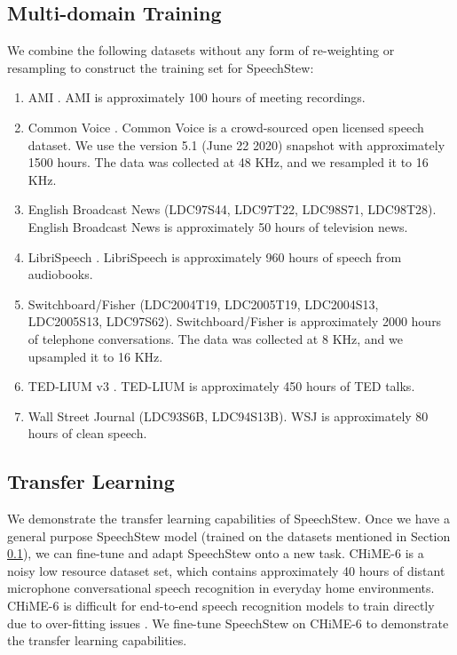 \documentclass[a4paper]{article}
\begin{document}
\subsection{Multi-domain Training}
\label{sec:mdtraining}
We combine the following datasets without any form of re-weighting or resampling to construct the training set for SpeechStew:
\begin{enumerate}[noitemsep]
    \item AMI \cite{carletta-mlmi-2005}. AMI is approximately 100 hours of meeting recordings.
    \item Common Voice \cite{lrec-2020}. Common Voice is a crowd-sourced open licensed speech dataset. We use the version 5.1 (June 22 2020) snapshot with approximately 1500 hours. The data was collected at 48 KHz, and we resampled it to 16 KHz.
    \item English Broadcast News (LDC97S44, LDC97T22, LDC98S71, LDC98T28). English Broadcast News is approximately 50 hours of television news.
    \item LibriSpeech \cite{panayotov-icassp-2015}. LibriSpeech is approximately 960 hours of speech from audiobooks.
    \item Switchboard/Fisher (LDC2004T19, LDC2005T19, LDC2004S13, LDC2005S13, LDC97S62). Switchboard/Fisher is approximately 2000 hours of telephone conversations. The data was collected at 8 KHz, and we upsampled it to 16 KHz.
    \item TED-LIUM v3 \cite{rousseau-lrec-2012,hernandez-specom-2018}. TED-LIUM is approximately 450 hours of TED talks.
    \item Wall Street Journal (LDC93S6B, LDC94S13B). WSJ is approximately 80 hours of clean speech.
\end{enumerate}

\subsection{Transfer Learning}
We demonstrate the transfer learning capabilities of SpeechStew. Once we have a general purpose SpeechStew model (trained on the datasets mentioned in Section \ref{sec:mdtraining}), we can fine-tune and adapt SpeechStew onto a new task. CHiME-6 \cite{watanabe-arxiv-2020} is a noisy low resource dataset set, which contains approximately 40 hours of distant microphone conversational speech recognition in everyday home environments. CHiME-6 is difficult for end-to-end speech recognition models to train directly due to over-fitting issues \cite{andrusenko-arxiv-2020}. We fine-tune SpeechStew on CHiME-6 to demonstrate the transfer learning capabilities.
\end{document}
